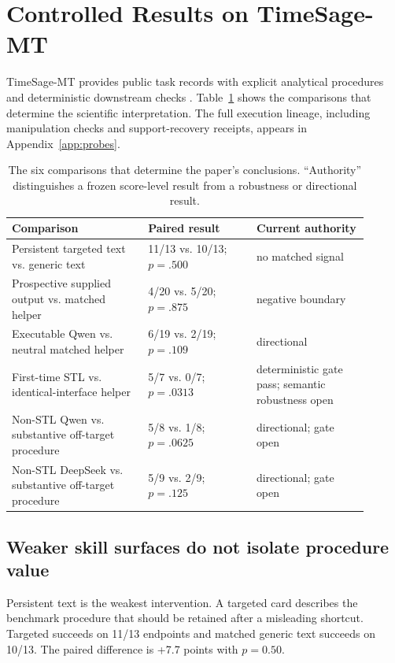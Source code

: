 \section{Controlled Results on TimeSage-MT}
\label{sec:probes}
TimeSage-MT provides public task records with explicit analytical procedures and deterministic downstream checks \citep{kong2026timesagemt}. Table~\ref{tab:ladder} shows the comparisons that determine the scientific interpretation. The full execution lineage, including manipulation checks and support-recovery receipts, appears in Appendix~\ref{app:probes}.

\begin{table}[t]
\centering
\small
\caption{The six comparisons that determine the paper's conclusions. ``Authority'' distinguishes a frozen score-level result from a robustness or directional result.}
\label{tab:ladder}
\begin{tabular}{@{}p{0.34\linewidth}p{0.27\linewidth}p{0.29\linewidth}@{}}
\toprule
Comparison & Paired result & Current authority \\
\midrule
Persistent targeted text vs. generic text & 11/13 vs. 10/13; $p=.500$ & no matched signal \\
Prospective supplied output vs. matched helper & 4/20 vs. 5/20; $p=.875$ & negative boundary \\
Executable Qwen vs. neutral matched helper & 6/19 vs. 2/19; $p=.109$ & directional \\
First-time STL vs. identical-interface helper & 5/7 vs. 0/7; $p=.0313$ & deterministic gate pass; semantic robustness open \\
Non-STL Qwen vs. substantive off-target procedure & 5/8 vs. 1/8; $p=.0625$ & directional; gate open \\
Non-STL DeepSeek vs. substantive off-target procedure & 5/9 vs. 2/9; $p=.125$ & directional; gate open \\
\bottomrule
\end{tabular}
\end{table}

\subsection{Weaker skill surfaces do not isolate procedure value}
Persistent text is the weakest intervention. A targeted card describes the benchmark procedure that should be retained after a misleading shortcut. Targeted succeeds on 11/13 endpoints and matched generic text succeeds on 10/13. The paired difference is +7.7 points with $p=0.50$.

